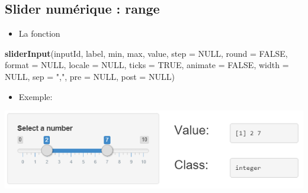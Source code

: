 \documentclass[
]{article}
\newenvironment{Shaded}{\begin{snugshade}}{\end{snugshade}}
\newcommand{\AttributeTok}[1]{\textcolor[rgb]{0.13,0.29,0.53}{#1}}
\newcommand{\CommentTok}[1]{\textcolor[rgb]{0.56,0.35,0.01}{\textit{#1}}}
\newcommand{\ConstantTok}[1]{\textcolor[rgb]{0.56,0.35,0.01}{#1}}
\newcommand{\DecValTok}[1]{\textcolor[rgb]{0.00,0.00,0.81}{#1}}
\newcommand{\FunctionTok}[1]{\textcolor[rgb]{0.13,0.29,0.53}{\textbf{#1}}}
\newcommand{\NormalTok}[1]{#1}
\newcommand{\StringTok}[1]{\textcolor[rgb]{0.31,0.60,0.02}{#1}}
\providecommand{\tightlist}{%
  \setlength{\itemsep}{0pt}\setlength{\parskip}{0pt}}
\begin{document}
\hypertarget{slider-numuxe9rique-range}{%
\subsection{Slider numérique : range}\label{slider-numuxe9rique-range}}

\begin{itemize}
\tightlist
\item
  La fonction
\end{itemize}

\begin{Shaded}
\begin{Highlighting}[]
\FunctionTok{sliderInput}\NormalTok{(inputId, label, min, max, value, }\AttributeTok{step =} \ConstantTok{NULL}\NormalTok{, }\AttributeTok{round =} \ConstantTok{FALSE}\NormalTok{,}
            \AttributeTok{format =} \ConstantTok{NULL}\NormalTok{, }\AttributeTok{locale =} \ConstantTok{NULL}\NormalTok{, }\AttributeTok{ticks =} \ConstantTok{TRUE}\NormalTok{, }\AttributeTok{animate =} \ConstantTok{FALSE}\NormalTok{,}
            \AttributeTok{width =} \ConstantTok{NULL}\NormalTok{, }\AttributeTok{sep =} \StringTok{","}\NormalTok{, }\AttributeTok{pre =} \ConstantTok{NULL}\NormalTok{, }\AttributeTok{post =} \ConstantTok{NULL}\NormalTok{)}
\end{Highlighting}
\end{Shaded}

\begin{itemize}
\tightlist
\item
  Exemple:
\end{itemize}

\begin{Shaded}
\end{Shaded}

\includegraphics{img/multiple_slider.png}
\end{document}

